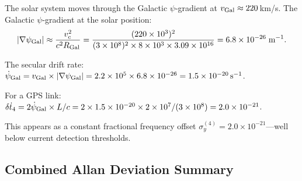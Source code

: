 \documentclass[aps,prd,twocolumn,superscriptaddress]{revtex4-2}
\begin{document}
The solar system moves through the Galactic $\psi$-gradient at
$v_{\rm Gal} \approx 220$\,km/s. The Galactic $\psi$-gradient
at the solar position:
\begin{equation}
|\nabla\psi_{\rm Gal}| \approx \frac{v_c^2}{c^2 R_{\rm Gal}}
= \frac{(220\times10^3)^2}{(3\times10^8)^2\times8\times10^3\times3.09\times10^{16}}
= 6.8\times10^{-26}\;\text{m}^{-1}.
\end{equation}

The secular drift rate:
$\dot{\psi}_{\rm Gal} = v_{\rm Gal}\times|\nabla\psi_{\rm Gal}|
= 2.2\times10^5\times6.8\times10^{-26} = 1.5\times10^{-20}\,\text{s}^{-1}$.

For a GPS link: $\delta\dot{t}_4 = 2\dot{\psi}_{\rm Gal}\times L/c
= 2\times1.5\times10^{-20}\times2\times10^7/(3\times10^8)
= 2.0\times10^{-21}$.

This appears as a constant fractional frequency offset
$\sigma_y^{(4)} = 2.0\times10^{-21}$---well below current detection
thresholds.

\subsection{Combined Allan Deviation Summary}
\end{document}
